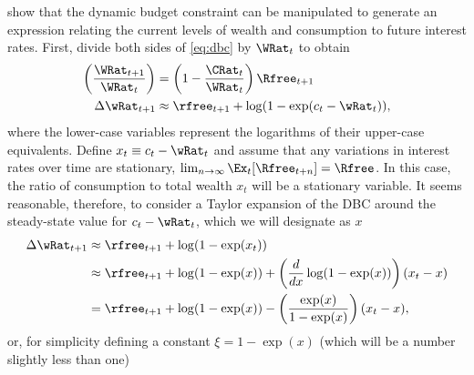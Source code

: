 \documentclass{handout}
\begin{document}
\cite{cmModel} show that the
dynamic budget constraint can be manipulated to generate an expression
relating the current levels of wealth and consumption to future
interest rates.  First, divide both sides of
\eqref{eq:dbc} by $\WRat_{t}$ to obtain
\begin{equation}\begin{gathered}\begin{aligned}
        \left(\frac{\WRat_{t+1}}{\WRat_{t}}\right) & =  \left(1-\frac{\CRat_{t}}{\WRat_{t}}\right)\Rfree_{t+1}  \\
        \Delta \wRat_{t+1} & \approx  \rfree_{t+1}+ \log(1-\exp(c_{t}-\wRat_{t})),
\end{aligned}\end{gathered}\end{equation}
where the lower-case variables represent the logarithms of their 
upper-case equivalents.  Define $x_{t} \equiv c_{t}-\wRat_{t}$ and assume that 
any variations in interest rates over time are stationary, $\lim_{n 
\rightarrow \infty} \Ex_{t}[\Rfree_{t+n}] = \Rfree$.  In this case, the ratio 
of consumption to total wealth $x_{t}$ will be a stationary variable.  
It seems reasonable, therefore, to consider a Taylor expansion of the 
DBC around the steady-state value for $c_{t}-\wRat_{t}$, which we will 
designate as $x$
\begin{equation}\begin{gathered}\begin{aligned}
\Delta \wRat_{t+1} & \approx       \rfree_{t+1} + \log(1-\exp(x_{t}))
\\ & \approx   \rfree_{t+1} + \log(1-\exp(x))+\left(\frac{d}{dx}\log(1-\exp(x))\right)(x_{t}-x)
\\ & =         \rfree_{t+1} + \log(1-\exp(x))-\left(\frac{\exp(x)}{1-\exp(x)}\right)(x_{t}-x),
\end{aligned}\end{gathered}\end{equation}
or, for simplicity defining a constant $\xi = 1-\exp(x)$ (which will
be a number slightly less than one)
\end{document}
